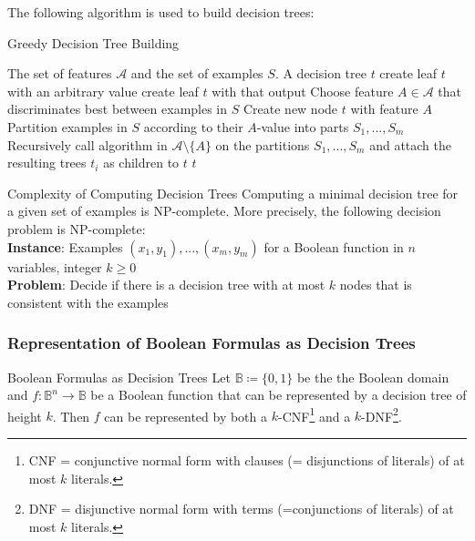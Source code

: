 \documentclass[english]{panikzettel}
\begin{document}

The following algorithm is used to build decision trees:

\begin{algo}{Greedy Decision Tree Building}
{
\renewcommand{\algorithmicrequire}{\textbf{Input:}}
\renewcommand{\algorithmicensure}{\textbf{Output:}}
  \begin{algorithmic}[1]
    \Require The set of features $\mathcal{A}$ and the set of examples $S$.
  \Ensure A decision tree $t$
      \State create leaf $t$ with an arbitrary value
      \State create leaf $t$ with that output
    \Else
      \State Choose feature $A\in\mathcal{A}$ that discriminates best between examples in $S$ 
      \State Create new node $t$ with feature $A$
      \State Partition examples in $S$ according to their $A$-value into parts $S_1,...,S_m$
      \State Recursively call algorithm in $\mathcal{A}\setminus \{A\}$ on the partitions $S_1,...,S_m$ and attach the resulting trees $t_i$ as children to $t$
    \EndIf
  \State \Return $t$
  \end{algorithmic}
}
\end{algo}

\begin{theo}{Complexity of Computing Decision Trees}
Computing a minimal decision tree for a given set of examples is NP-complete.
More precisely, the following decision problem is NP-complete:\\
\textbf{Instance}: Examples $(x_1,y_1),...,(x_m,y_m)$ for a Boolean function in $n$ variables, integer $k\geq 0$\\
\textbf{Problem}: Decide if there is a decision tree with at most $k$ nodes that is consistent with the examples
\end{theo}


\subsubsection{Representation of Boolean Formulas as Decision Trees}
\begin{theo}{Boolean Formulas as Decision Trees}
Let $\mathbb{B} \coloneqq \{0,1\}$ be the the Boolean domain and $f:\mathbb{B}^n\rightarrow \mathbb{B}$ be a Boolean function that can be represented by a decision tree of height $k$. Then $f$ can be represented by both a $k$-CNF\footnote{CNF = conjunctive normal form with clauses (= disjunctions of literals) of at most $k$ literals.} and a $k$-DNF\footnote{DNF = disjunctive normal form with terms (=conjunctions of literals) of at most $k$ literals.}.
\end{theo}
\end{document}
